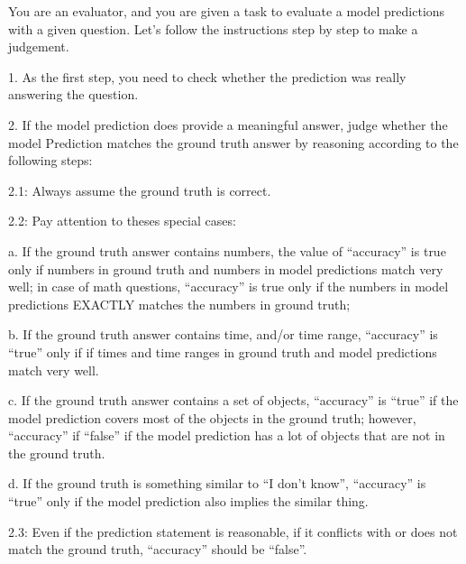 \documentclass{article}
\theoremstyle{plain}
\theoremstyle{definition}
\theoremstyle{remark}
\begin{document}
\begin{tcolorbox}[colback=gray!10!white, colframe=black, arc=2mm, title=\small \textbf{LLM Judge Prompt}]
You are an evaluator, and you are given a task to evaluate a model predictions with a given question.
Let's follow the instructions step by step to make a judgement.
\par\medskip

1. As the first step, you need to check whether the prediction was really answering the question.
\par\medskip

2. If the model prediction does provide a meaningful answer, judge whether the model Prediction matches the ground truth answer by reasoning according to the following steps:
\par\medskip

2.1: Always assume the ground truth is correct.
\par\medskip

2.2: Pay attention to theses special cases:
\par\medskip

a. If the ground truth answer contains numbers, the value of ``accuracy'' is true only if numbers in ground truth and numbers in model predictions match very well; in case of math questions, ``accuracy'' is true only if the numbers in model predictions EXACTLY matches the numbers in ground truth;
\par\medskip

b. If the ground truth answer contains time, and/or time range, ``accuracy'' is ``true'' only if if times and time ranges in ground truth and model predictions match very well.
\par\medskip

c. If the ground truth answer contains a set of objects, ``accuracy'' is ``true'' if the model prediction covers most of the objects in the ground truth; however, ``accuracy'' if ``false'' if the model prediction has a lot of objects that are not in the ground truth.
\par\medskip

d. If the ground truth is something similar to ``I don't know'', ``accuracy'' is ``true'' only if the model prediction also implies the similar thing.
\par\medskip

2.3: Even if the prediction statement is reasonable, if it conflicts with or does not match the ground truth, ``accuracy'' should be ``false''.
\par\medskip


\end{tcolorbox}
\end{document}
